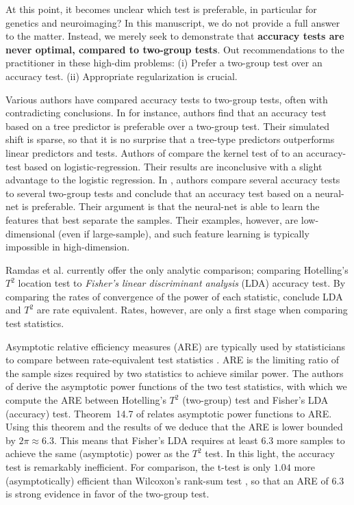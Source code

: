 \documentclass[onecolumn,draftclsnofoot]{IEEEtran}
\begin{document}
At this point, it becomes unclear which test is preferable, in particular for genetics and neuroimaging?
In this manuscript, we do not provide a full answer to the matter.
Instead, we merely seek to demonstrate that \textbf{accuracy tests are never optimal, compared to two-group tests}.
Out recommendations to the practitioner in these high-dim problems:
(i) Prefer a two-group test over an accuracy test. 
(ii) Appropriate regularization is crucial. 

Various authors have compared accuracy tests to two-group tests, often with contradicting conclusions.
In \cite{yu2007two} for instance, authors find that an accuracy test based on a tree predictor is preferable over a two-group test. 
Their simulated shift is sparse, so that it is no surprise that a tree-type predictors outperforms linear predictors and tests. 
Authors of \cite{olivetti2013kernel} compare the kernel test of \cite{gretton_kernel_2012-1} to an accuracy-test based on logistic-regression.
Their results are inconclusive with a slight advantage to the logistic regression.
In \cite{lopez2016revisiting}, authors compare several accuracy tests to several two-group tests and conclude that an accuracy test based on a neural-net is preferable. 
Their argument is that the neural-net is able to learn the features that best separate the samples. Their examples, however, are low-dimensional (even if large-sample), and such feature learning is typically impossible in high-dimension.

Ramdas et al. \cite{ramdas_classification_2016} currently offer the only analytic comparison; comparing Hotelling's $T^2$ location test to \emph{Fisher's linear discriminant analysis} (LDA) accuracy test. 
By comparing the rates of convergence of the power of each statistic, \cite{ramdas_classification_2016} conclude LDA and $T^2$ are rate equivalent. 
Rates, however, are only a first stage when comparing test statistics. 

Asymptotic relative efficiency measures (ARE) are typically used by statisticians to compare between rate-equivalent test statistics \cite{vaart_asymptotic_1998}.
ARE is the limiting ratio of the sample sizes required by two statistics to achieve similar power. 
The authors of \cite{ramdas_classification_2016} derive the asymptotic power functions of the two test statistics, with which we compute the ARE between Hotelling's $T^2$ (two-group) test and Fisher's LDA (accuracy) test.
Theorem~14.7 of \cite{vaart_asymptotic_1998} relates asymptotic power functions to ARE.
Using this theorem and the results of \cite{ramdas_classification_2016} we deduce that the ARE is lower bounded by $2 \pi \approx 6.3$. 
This means that Fisher's LDA requires at least $6.3$ more samples to achieve the same (asymptotic) power as the $T^2$ test. 
In this light, the accuracy test is remarkably inefficient.  
For comparison, the t-test is only $1.04$ more (asymptotically) efficient than Wilcoxon's rank-sum test \cite{lehmann_parametric_2009}, so that an ARE of $6.3$ is strong evidence in favor of the two-group test. 
\end{document}
